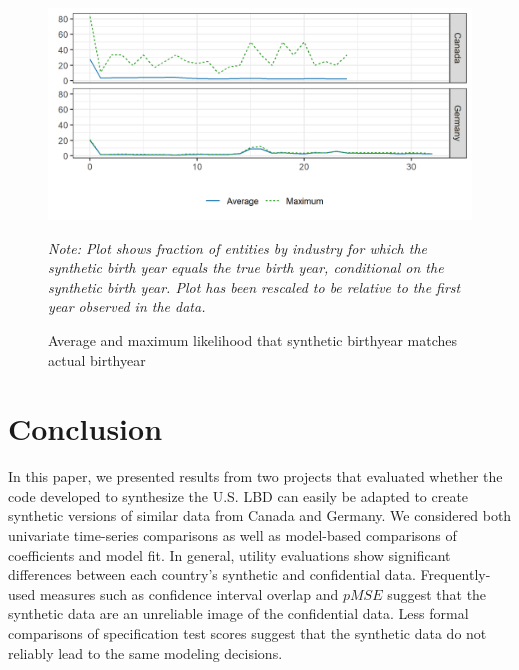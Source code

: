 \documentclass[10pt,twoside]{article}
\begin{document}
\begin{figure}[ht]
\includegraphics[width=\linewidth]{r-graphs/fig_conf_both.png}
\caption{Average and maximum likelihood that synthetic birthyear matches actual birthyear\label{fig:Conf.Both}}

\begin{center}
\begin{minipage}{0.7\linewidth}
	\footnotesize \it
Note: Plot shows fraction of entities by industry for which the synthetic birth year equals the true birth year, conditional on the synthetic birth year. Plot has been rescaled to be relative to the first year observed in the data.	
\end{minipage}
\end{center}
\end{figure} 



 \newpage
\section{Conclusion}
\label{sec:conclusion}

In this paper, we presented results from two projects that evaluated whether the code developed to synthesize the U.S. LBD can easily be adapted to create synthetic versions of similar data from Canada and Germany. We considered both univariate time-series comparisons as well as model-based comparisons of coefficients and model fit. In general, utility evaluations show significant differences between each country's synthetic and confidential data. Frequently-used measures such as confidence interval overlap and $pMSE$ suggest that the synthetic data are an unreliable image of the confidential data. Less formal comparisons of specification test scores suggest that the synthetic data do not reliably lead to  the same modeling decisions.
\end{document}
